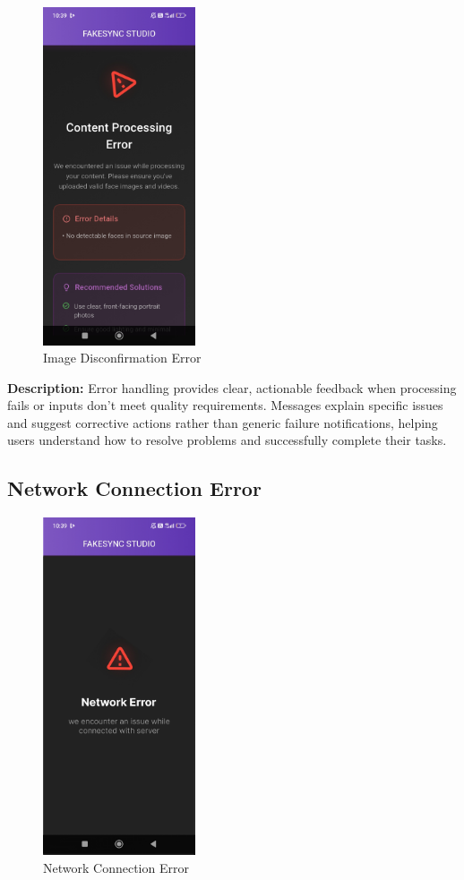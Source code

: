 \documentclass[12pt,a4paper]{report}
\begin{document}
\begin{figure}[H]
\centering
\includegraphics[width=0.4\textwidth]{figures/image_disconfirmation_error.png}
\caption{Image Disconfirmation Error}
\label{fig:image_error}
\end{figure}

\textbf{Description:} Error handling provides clear, actionable feedback when processing fails or inputs don't meet quality requirements. Messages explain specific issues and suggest corrective actions rather than generic failure notifications, helping users understand how to resolve problems and successfully complete their tasks.

\subsection{Network Connection Error}

\begin{figure}[H]
\centering
\includegraphics[width=0.4\textwidth]{figures/network_error.png}
\caption{Network Connection Error}
\label{fig:network_error}
\end{figure}
\end{document}

